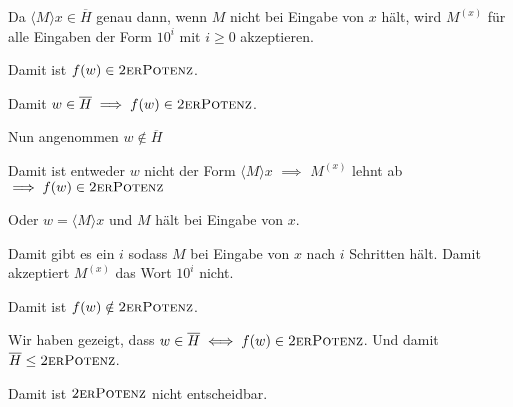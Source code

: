 \documentclass[a4paper,12pt]{article}
\begin{document}
Da $\langle M\rangle x\in \overline{H}$ genau dann, wenn $M$ nicht bei Eingabe von $x$ hält, wird $M^{(x)}$ für alle Eingaben der Form $10^i$ mit $i\geq 0$ akzeptieren.

Damit ist $f(w)\in \textsc{2erPotenz}$.

Damit $w\in \overline{H}\implies f(w)\in \textsc{2erPotenz}$.

Nun angenommen $w\notin \overline{H}$

Damit ist entweder $w$ nicht der Form $\langle M\rangle x$ $\implies$ $M^{(x)}$ lehnt ab $\implies f(w)\in \textsc{2erPotenz}$

Oder $w=\langle M\rangle x$ und $M$ hält bei Eingabe von $x$.

Damit gibt es ein $i$ sodass $M$ bei Eingabe von $x$ nach $i$ Schritten hält. Damit akzeptiert $M^{(x)}$ das Wort $10^i$ nicht.

Damit ist $f(w)\notin \textsc{2erPotenz}$.

\vspace{1cm}

Wir haben gezeigt, dass $w\in \overline{H}\iff f(w)\in \textsc{2erPotenz}$. Und damit $\overline{H}\leq \textsc{2erPotenz}$.

Damit ist $\textsc{2erPotenz}$ nicht entscheidbar.
\end{document}
